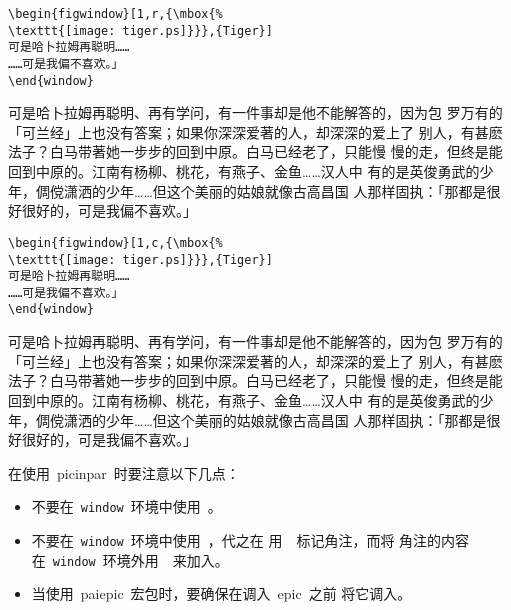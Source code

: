 \begin{Verbatim}
\begin{figwindow}[1,r,{\mbox{%
\texttt{[image: tiger.ps]}}},{Tiger}]
可是哈卜拉姆再聪明……
……可是我偏不喜欢。」
\end{window}
\end{Verbatim}

\begin{figwindow}
	可是哈卜拉姆再聪明、再有学问，有一件事却是他不能解答的，因为包
	罗万有的「可兰经」上也没有答案；如果你深深爱著的人，却深深的爱上了
	别人，有甚麽法子？白马带著她一步步的回到中原。白马已经老了，只能慢
	慢的走，但终是能回到中原的。江南有杨柳、桃花，有燕子、金鱼……汉人中
	有的是英俊勇武的少年，倜傥潇洒的少年……但这个美丽的姑娘就像古高昌国
	人那样固执：「那都是很好很好的，可是我偏不喜欢。」
\end{figwindow}

\begin{Verbatim}
\begin{figwindow}[1,c,{\mbox{%
\texttt{[image: tiger.ps]}}},{Tiger}]
可是哈卜拉姆再聪明……
……可是我偏不喜欢。」
\end{window}
\end{Verbatim}

\begin{figwindow}
	可是哈卜拉姆再聪明、再有学问，有一件事却是他不能解答的，因为包
	罗万有的「可兰经」上也没有答案；如果你深深爱著的人，却深深的爱上了
	别人，有甚麽法子？白马带著她一步步的回到中原。白马已经老了，只能慢
	慢的走，但终是能回到中原的。江南有杨柳、桃花，有燕子、金鱼……汉人中
	有的是英俊勇武的少年，倜傥潇洒的少年……但这个美丽的姑娘就像古高昌国
	人那样固执：「那都是很好很好的，可是我偏不喜欢。」
\end{figwindow}


在使用~\textsf{picinpar}~时要注意以下几点：
\begin{itemize}
	\item 不要在~\texttt{window}~环境中使用~。
	\item 不要在~\texttt{window}~环境中使用~，代之在
	用~~标记角注，而将
	角注的内容在~\texttt{window}~环境外用~~来加入。
	\item 当使用~pai{epic}~宏包时，要确保在调入~\textsf{epic}~之前
	将它调入。
\end{itemize}

